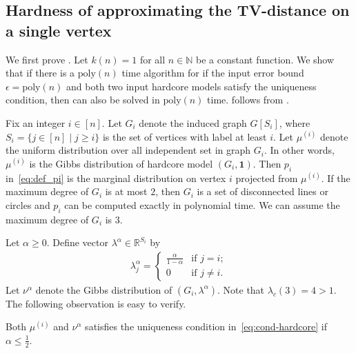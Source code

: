 \subsection{Hardness of approximating the TV-distance on a single vertex}
We first prove . Let $k(n) = 1$ for all $n \in \mathbb{N}$ be a constant function. We show that if there is a $\mathrm{poly}(n)$ time algorithm for  if the input error bound $\epsilon = \mathrm{poly}(n)$ and both two input hardcore models satisfy the uniqueness condition, then  can also be solved in $\mathrm{poly}(n)$ time.  follows from .

Fix an integer $i \in [n]$. Let $G_i$ denote the induced graph $G[S_i]$, where $S_i =\{j \in [n] \mid j \geq i\}$ is the set of vertices with label at least $i$. Let $\mu^{(i)}$ denote the uniform distribution over all independent set in graph $G_i$. In other words, $\mu^{(i)}$ is the Gibbs distribution of hardcore model $(G_i,\boldsymbol{1})$. Then $p_i$ in~\eqref{eq:def_pi} is the marginal distribution on vertex $i$ projected from $\mu^{(i)}$. If the maximum degree of $G_i$ is at most $2$, then $G_i$ is a set of disconnected lines or circles and $p_i$ can be computed exactly in polynomial time. We can assume the maximum degree of $G_i$ is $3$.  

Let $\alpha \geq 0$. Define vector $\lambda^\alpha \in \mathbb{R}^{S_i}$ by
\begin{align}\label{eq:def-lambda-alpha}
    \lambda_j^\alpha = \begin{cases}
        \frac{\alpha}{1 - \alpha} &\text{if } j = i; \\
        0 &\text{if } j \neq i.
    \end{cases}
\end{align}
Let $\nu^\alpha$ denote the Gibbs distribution of $(G_i,\lambda^\alpha)$. Note that $\lambda_c(3) = 4 > 1$. The following observation is easy to verify.
\begin{observation}\label{ob:uniq}
Both $\mu^{(i)}$ and $\nu^\alpha$ satisfies the uniqueness condition in~\eqref{eq:cond-hardcore} if $\alpha \leq \frac{1}{2}$.
\end{observation}


